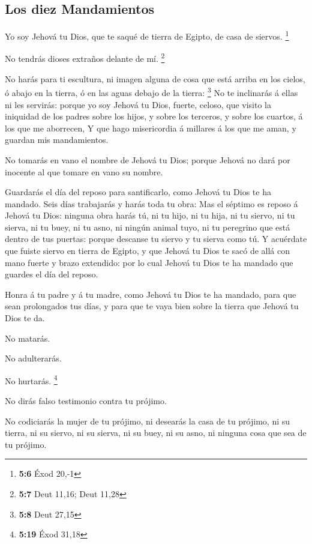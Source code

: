 \hypertarget{los-diez-mandamientos}{%
\subsection{Los diez Mandamientos}\label{los-diez-mandamientos}}

 Yo soy Jehová tu Dios, que te saqué de tierra de Egipto, de
casa de siervos. \footnote{\textbf{5:6} Éxod 20,-1}

 No tendrás dioses extraños delante de mí. \footnote{\textbf{5:7}
  Deut 11,16; Deut 11,28}

 No harás para ti escultura, ni imagen alguna de cosa que
está arriba en los cielos, ó abajo en la tierra, ó en las aguas debajo
de la tierra: \footnote{\textbf{5:8} Deut 27,15}  No te
inclinarás á ellas ni les servirás: porque yo soy Jehová tu Dios,
fuerte, celoso, que visito la iniquidad de los padres sobre los hijos, y
sobre los terceros, y sobre los cuartos, á los que me aborrecen,
 Y que hago misericordia á millares á los que me aman, y
guardan mis mandamientos.

 No tomarás en vano el nombre de Jehová tu Dios; porque
Jehová no dará por inocente al que tomare en vano su nombre.

 Guardarás el día del reposo para santificarlo, como Jehová
tu Dios te ha mandado.  Seis días trabajarás y harás toda
tu obra:  Mas el séptimo es reposo á Jehová tu Dios:
ninguna obra harás tú, ni tu hijo, ni tu hija, ni tu siervo, ni tu
sierva, ni tu buey, ni tu asno, ni ningún animal tuyo, ni tu peregrino
que está dentro de tus puertas: porque descanse tu siervo y tu sierva
como tú.  Y acuérdate que fuiste siervo en tierra de
Egipto, y que Jehová tu Dios te sacó de allá con mano fuerte y brazo
extendido: por lo cual Jehová tu Dios te ha mandado que guardes el día
del reposo.

 Honra á tu padre y á tu madre, como Jehová tu Dios te ha
mandado, para que sean prolongados tus días, y para que te vaya bien
sobre la tierra que Jehová tu Dios te da.

 No matarás.

 No adulterarás.

 No hurtarás. \footnote{\textbf{5:19} Éxod 31,18}

 No dirás falso testimonio contra tu prójimo.

 No codiciarás la mujer de tu prójimo, ni desearás la casa
de tu prójimo, ni su tierra, ni su siervo, ni su sierva, ni su buey, ni
su asno, ni ninguna cosa que sea de tu prójimo.

